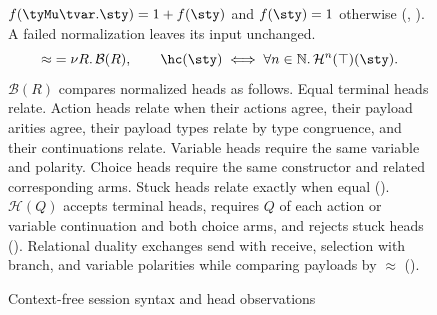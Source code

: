 \begin{figure}[tp]
  $f(\tyMu\tvar.\sty)=1+f(\sty)$ and $f(\sty)=1$ otherwise
  (, ). A failed normalization leaves its input unchanged.
  \[
    {\approx}=\nu R.\,\mathcal B(R),\qquad
    \hc(\sty)\iff\forall n\in\Nat\st\mathcal H^n(\top)(\sty).
  \]
  $\mathcal B(R)$ compares normalized heads as follows. Equal terminal heads relate. Action heads relate
  when their actions agree, their payload arities agree, their payload
  types relate by type congruence, and their continuations relate.
  Variable heads require the same variable and polarity. Choice heads
  require the same constructor and related corresponding arms.
  Stuck heads relate exactly when equal ().
  $\mathcal H(Q)$ accepts terminal heads, requires $Q$ of each action
  or variable continuation and both choice arms, and rejects stuck heads
  ().
  Relational duality exchanges send with receive, selection with branch,
  and variable polarities while comparing payloads by $\approx$
  ().
  \caption{Context-free session syntax and head observations}
  \label{fig:cfst-syntax}
\end{figure}

